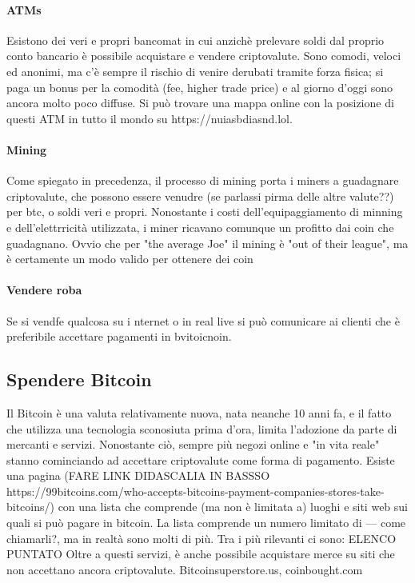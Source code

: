 \documentclass {article}
\begin{document}
\paragraph {ATMs}


Esistono dei veri e propri bancomat in cui anzichè prelevare soldi dal proprio conto bancario è possibile acquistare e vendere criptovalute.
Sono comodi, veloci ed anonimi, ma c'è sempre il rischio di venire derubati tramite forza fisica; si paga un bonus per la comodità (fee, higher trade price) e al giorno d'oggi sono ancora molto poco diffuse.
Si può trovare una mappa online con la posizione di questi ATM in tutto il mondo su https://nuiasbdiasnd.lol.


\paragraph {Mining}


Come spiegato in precedenza, il processo di mining porta i miners a guadagnare criptovalute, che possono essere venudre (se parlassi pirma delle altre valute??) per btc, o soldi veri e propri.
Nonostante i costi dell'equipaggiamento di minning e dell'elettrricità utilizzata, i miner ricavano comunque un profitto dai coin che guadagnano.
Ovvio che per "the average Joe" il mining è "out of their league", ma è certamente un modo valido per ottenere dei coin


\paragraph {Vendere roba}


Se si vendfe qualcosa su i nternet o in real live si può comunicare ai clienti che è preferibile accettare pagamenti in bvitoicnoin.


\subsection {Spendere Bitcoin}


Il Bitcoin è una valuta relativamente nuova, nata neanche 10 anni fa, e il fatto che utilizza una tecnologia sconosiuta prima d'ora, limita l'adozione da parte di mercanti e servizi.
Nonostante ciò, sempre più negozi online e "in vita reale" stanno cominciando ad accettare criptovalute come forma di pagamento. Esiste una pagina (FARE LINK DIDASCALIA IN BASSSO https://99bitcoins.com/who-accepts-bitcoins-payment-companies-stores-take-bitcoins/) con una lista che comprende (ma non è limitata a) luoghi e siti web sui quali si può pagare in bitcoin.
La lista comprende un numero limitato di --- come chiamarli?, ma in realtà sono molti di più.
Tra i più rilevanti ci sono: ELENCO PUNTATO
Oltre a questi servizi, è anche possibile acquistare merce su siti che non accettano ancora criptovalute.
Bitcoinsuperstore.us, coinbought.com
\end{document}
